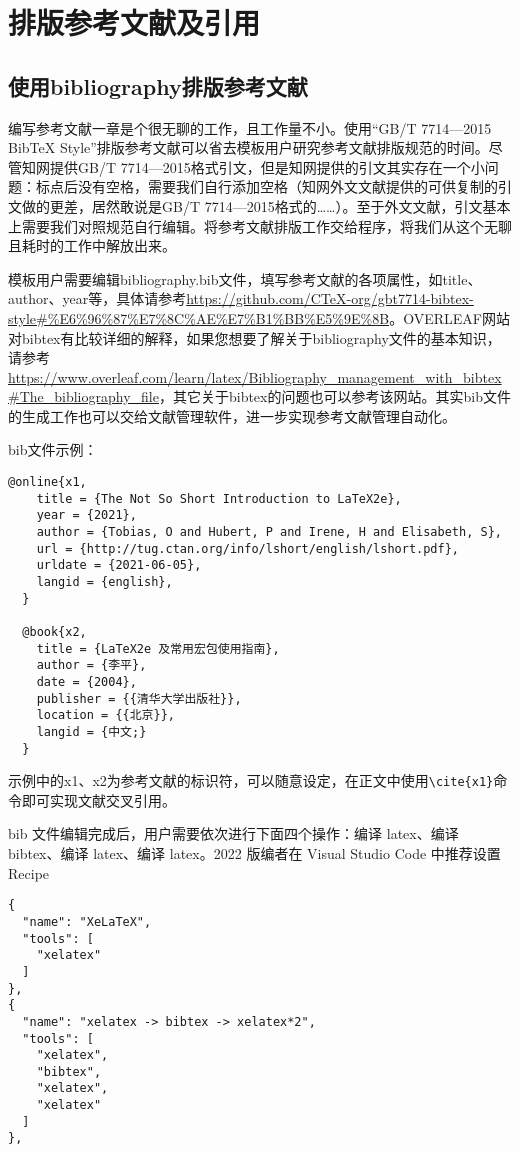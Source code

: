 \section{排版参考文献及引用}

\subsection{使用bibliography排版参考文献}

编写参考文献一章是个很无聊的工作，且工作量不小。使用“GB/T 7714—2015 BibTeX Style”排版参考文献可以省去模板用户研究参考文献排版规范的时间。尽管知网提供GB/T 7714—2015格式引文，但是知网提供的引文其实存在一个小问题：标点后没有空格，需要我们自行添加空格（知网外文文献提供的可供复制的引文做的更差，居然敢说是GB/T 7714—2015格式的……）。至于外文文献，引文基本上需要我们对照规范自行编辑。将参考文献排版工作交给程序，将我们从这个无聊且耗时的工作中解放出来。

模板用户需要编辑bibliography.bib文件，填写参考文献的各项属性，如title、author、year等，具体请参考\url{https://github.com/CTeX-org/gbt7714-bibtex-style#%E6%96%87%E7%8C%AE%E7%B1%BB%E5%9E%8B}。OVERLEAF网站对bibtex有比较详细的解释，如果您想要了解关于bibliography文件的基本知识，请参考\url{https://www.overleaf.com/learn/latex/Bibliography_management_with_bibtex#The_bibliography_file}，其它关于bibtex的问题也可以参考该网站。其实bib文件的生成工作也可以交给文献管理软件，进一步实现参考文献管理自动化。

bib文件示例：
{
\color{green!50!black}
\begin{lstlisting}[breaklines=true,]
  @online{x1,
    title = {The Not So Short Introduction to LaTeX2e},
    year = {2021},
    author = {Tobias, O and Hubert, P and Irene, H and Elisabeth, S},
    url = {http://tug.ctan.org/info/lshort/english/lshort.pdf},
    urldate = {2021-06-05},
    langid = {english},
  }
  
  @book{x2,
    title = {LaTeX2e 及常用宏包使用指南},
    author = {李平},
    date = {2004},
    publisher = {{清华大学出版社}},
    location = {{北京}},
    langid = {中文;}
  }
\end{lstlisting}
}

示例中的x1、x2为参考文献的标识符，可以随意设定，在正文中使用\verb|\cite{x1}|命令即可实现文献交叉引用。

bib 文件编辑完成后，用户需要依次进行下面四个操作：编译 latex、编译 bibtex、编译 latex、编译 latex。2022 版编者在 Visual Studio Code 中推荐设置 Recipe

{
\color{green!50!black}
\begin{lstlisting}[breaklines=true,]
{
  "name": "XeLaTeX",
  "tools": [
    "xelatex"
  ]
},
{
  "name": "xelatex -> bibtex -> xelatex*2",
  "tools": [
    "xelatex",
    "bibtex",
    "xelatex",
    "xelatex"
  ]
},
\end{lstlisting}
}

